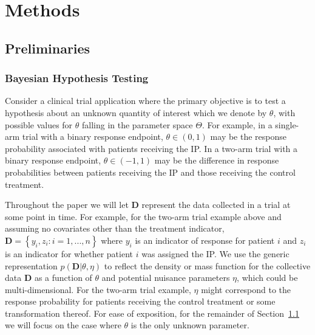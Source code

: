 \documentclass[12pt]{article}
\begin{document}
\section{Methods}\label{sec:methods}

\subsection{Preliminaries}\label{sec:preliminaries}
\subsubsection{Bayesian Hypothesis Testing}
Consider a clinical trial application where the primary objective is to test a hypothesis about an unknown quantity of interest which we denote by $\theta$, with possible values
for $\theta$ falling in the parameter space $\Theta$.
%
For example, in a single-arm trial with a binary response endpoint, $\theta \in (0,1)$ may be the response probability associated with patients receiving the IP.
%
In a two-arm trial with a binary response endpoint, $\theta \in (-1,1)$ may be the difference in response probabilities between patients receiving the IP and those receiving the control treatment.

Throughout the paper we will let $\mathbf{D}$ represent the data collected in a trial at some point in time. 
%
For example, for the two-arm trial example above and assuming no covariates other than the treatment indicator, $\mathbf{D}=\left\{y_i,z_i:i=1,...,n\right\}$ where $y_i$ is an indicator of response for patient $i$ and $z_i$ is an indicator for whether patient $i$ was assigned the IP.
%
We use the generic representation $p(\mathbf{D}|\theta,\eta)$ to reflect the density or mass function for the collective data $\mathbf{D}$ as 
a function of $\theta$ and potential nuisance parameters $\eta$, which could be multi-dimensional.
%
For the two-arm trial example, $\eta$ might correspond to the response probability for patients receiving the control treatment or some transformation thereof. 
For ease of exposition, for the remainder of Section~\ref{sec:preliminaries} we will focus on the case where $\theta$ is the only unknown parameter.
\end{document}
